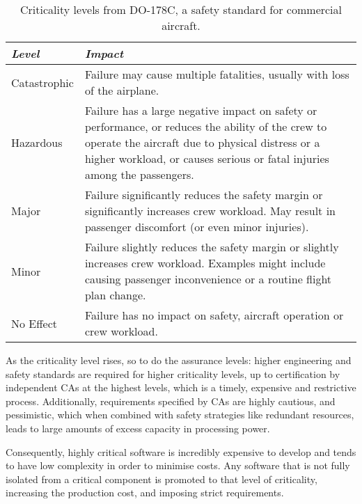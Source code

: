 \begin{table}
     \centering
     \begin{tabular}{ l p{10cm}} \toprule
         \emph{Level}   & \emph{Impact} \\ \midrule
         Catastrophic   & Failure may cause multiple fatalities, usually with loss of the airplane. \\
         Hazardous      & Failure has a large negative impact on safety or performance, or reduces the
                          ability of the crew to operate the aircraft due to physical distress or 
                          a higher workload, or causes serious or fatal injuries among the passengers.\\
         Major          & Failure significantly reduces the safety margin or significantly increases
                          crew workload. May result in passenger discomfort (or even minor
                          injuries).\\
         Minor          & Failure slightly reduces the safety margin or slightly increases crew
                          workload. Examples might include causing passenger inconvenience or a
                          routine flight plan change. \\
         No Effect      & Failure has no impact on safety, aircraft operation or crew workload. \\
         \bottomrule
     \end{tabular}
     \caption[Criticality levels from DO-178C]{Criticality levels from DO-178C, a safety standard for commercial aircraft.}
     \label{tab:criticality_table}
 \end{table}

As the criticality level rises, so to do the assurance levels: higher engineering and safety standards are required for higher criticality levels, up to
certification by independent \glspl{CA} at the highest levels, which is a timely,
expensive and restrictive process. Additionally, requirements specified by \glspl{CA} are highly
cautious, and pessimistic, which when combined with safety strategies like redundant resources,
leads to large amounts of excess capacity in processing power. 

Consequently, highly
critical software is incredibly expensive to develop and tends to have low complexity in order to
minimise costs. Any software that is not fully isolated from a critical component is promoted to
that level of criticality, increasing the production cost, and imposing strict requirements.

